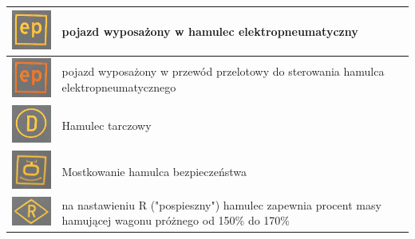 \begin{table}
\begin{tabular}{|c|m{8cm}|}
	\hline 
	\includegraphics[width=2.5cm]{skryptkierownik-img/skryptkierownik-img028.jpg}
	& pojazd wyposażony w hamulec elektropneumatyczny\\
	\hline
	\includegraphics[width=2.5cm]{skryptkierownik-img/skryptkierownik-img029.jpg}
	& pojazd wyposażony w przewód przelotowy do sterowania hamulca elektropneumatycznego\\
	\hline
	\includegraphics[width=2.5cm]{skryptkierownik-img/skryptkierownik-img030.jpg} & Hamulec tarczowy\\
	\hline
	\includegraphics[width=2.5cm]{skryptkierownik-img/skryptkierownik-img031.jpg} & Mostkowanie hamulca bezpieczeństwa\\
	\hline
	\includegraphics[width=2.5cm]{skryptkierownik-img/skryptkierownik-img032.jpg} & na nastawieniu R ("pospieszny") hamulec zapewnia procent masy hamującej wagonu próżnego od 150\% do 170\%\\
	\hline
\end{tabular}
\end{table} 

